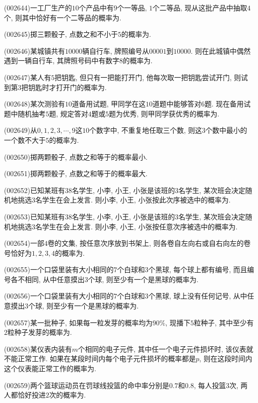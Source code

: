 \item (002644)一工厂生产的$10$个产品中有$9$个一等品, $1$个二等品, 现从这批产品中抽取$4$个, 则其中恰好有一个二等品的概率为.
\item (002645)掷三颗骰子, 点数之和不小于$5$的概率为.
\item (002646)某城镇共有$10000$辆自行车, 牌照编号从$00001$到$10000$. 则在此城镇中偶然遇到一辆自行车, 其牌照号码中有数字$8$的概率为.
\item (002647)某人有$5$把钥匙, 但只有一把能打开门, 他每次取一把钥匙尝试开门, 则试到第$3$把钥匙时才打开门的概率为.
\item (002648)某次测验有$10$道备用试题, 甲同学在这$10$道题中能够答对$6$题. 现在备用试题中随机抽考$5$题, 规定答对$4$题或$5$题为优秀, 则甲同学获优秀的概率为.
\item (002649)从$0,1,2,3,\cdots,9$这$10$个数字中, 不重复地任取三个数, 则这$3$个数中最小的一个数不大于$5$的概率为.
\item (002650)掷两颗骰子, 点数之和等于的概率最小.
\item (002651)掷两颗骰子, 点数之和等于的概率最大.
\item (002652)已知某班有$38$名学生, 小李, 小王, 小张是该班的$3$名学生, 某次班会决定随机地挑选$3$名学生在会上发言. 则小李, 小王, 小张按此次序被选中的概率为.
\item (002653)已知某班有$38$名学生, 小李, 小王, 小张是该班的$3$名学生, 某次班会决定随机地挑选$3$名学生在会上发言. 则小李, 小王, 小张按任意次序被选中的概率为.
\item (002654)一部$4$卷的文集, 按任意次序放到书架上, 则各卷自左向右或自右向左的卷号恰好为$1,2,3,4$的概率为.
\item (002655)一个口袋里装有大小相同的$7$个白球和$3$个黑球, 每个球上都有编号, 而且编号各不相同, 从中任意摸出$3$个球, 则至少有一个是黑球的概率为.
\item (002656)一个口袋里装有大小相同的$7$个白球和$3$个黑球, 球上没有任何记号, 从中任意摸出$3$个球, 则至少有一个是黑球的概率为.
\item (002657)某一批种子, 如果每一粒发芽的概率均为$90\%$, 现播下$5$粒种子, 其中至少有$2$粒种子发芽的概率为.
\item (002658)某仪表内装有$m$个相同的电子元件, 其中任一个电子元件损坏时, 该仪表就不能正常工作. 如果在某段时间内每个电子元件损坏的概率都是$p$, 则在这段时间内这个仪表能正常工作的概率为.
\item (002659)两个篮球运动员在罚球线投篮的命中率分别是$0.7$和$0.8$, 每人投篮$3$次, 两人都恰好投进$2$次的概率为.
